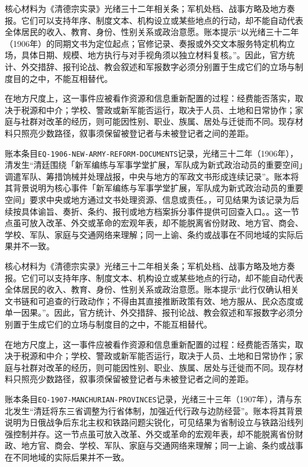核心材料为《清德宗实录》光绪三十二年相关条；军机处档、战事方略及地方奏报。它们可以支持年序、制度文本、机构设立或某些地点的行动，却不能自动代表全体居民的收入、教育、身份、性别关系或政治意愿。账本提示“以光绪三十二年（1906年）的同期文书为定位起点；官修记录、奏报或外交文本服务特定机构立场，具体日期、规模、地方执行与对手视角须以独立材料复核。”。因此，官方统计、外交措辞、报刊论战、教会叙述和军报数字必须分别置于生成它们的立场与制度目的之中，不能互相替代。

在地方尺度上，这一事件应被看作资源和信息重新配置的过程：经费能否落实，取决于税源和中介；学校、警政或新军能否运行，取决于人员、土地和日常协作；家庭与社群对改革的经历，则可能因性别、职业、族属、居处与迁徙而不同。现存材料只照亮少数路径，叙事须保留被登记者与未被登记者之间的差距。

账本条目\texttt{EQ-1906-NEW-ARMY-REFORM-DOCUMENTS}记录，光绪三十二年（1906年），清发生“清廷围绕「新军编练与军事学堂扩展，军队成为新式政治动员的重要空间」调遣军队、筹措饷械并处理战报，中央与地方的军政文书形成连续记录”。账本将其背景说明为核心事件「新军编练与军事学堂扩展，军队成为新式政治动员的重要空间」要求中央或地方通过文书处理资源、信息或责任。，可见结果为该记录为后续按具体谕旨、奏折、条约、报刊或地方档案拆分事件提供可回查入口。。这一节点虽可放入改革、外交或革命的宏观年表，却不能脱离省份财政、地方官、商会、学校、军队、家庭与交通网络来理解；同一上谕、条约或战事在不同地域的实际后果并不一致。

核心材料为《清德宗实录》光绪三十二年相关条；军机处档、战事方略及地方奏报。它们可以支持年序、制度文本、机构设立或某些地点的行动，却不能自动代表全体居民的收入、教育、身份、性别关系或政治意愿。账本提示“此行仅确认相关文书链和可追查的行政动作；不得由其直接推断政策有效、地方服从、民众态度或单一因果。”。因此，官方统计、外交措辞、报刊论战、教会叙述和军报数字必须分别置于生成它们的立场与制度目的之中，不能互相替代。

在地方尺度上，这一事件应被看作资源和信息重新配置的过程：经费能否落实，取决于税源和中介；学校、警政或新军能否运行，取决于人员、土地和日常协作；家庭与社群对改革的经历，则可能因性别、职业、族属、居处与迁徙而不同。现存材料只照亮少数路径，叙事须保留被登记者与未被登记者之间的差距。

账本条目\texttt{EQ-1907-MANCHURIAN-PROVINCES}记录，光绪三十三年（1907年），清与东北发生“清廷将东三省调整为行省体制，加强近代行政与边防经营”。账本将其背景说明为日俄战争后东北主权和铁路问题尖锐化，可见结果为省制设立与铁路沿线列强控制并存。这一节点虽可放入改革、外交或革命的宏观年表，却不能脱离省份财政、地方官、商会、学校、军队、家庭与交通网络来理解；同一上谕、条约或战事在不同地域的实际后果并不一致。


